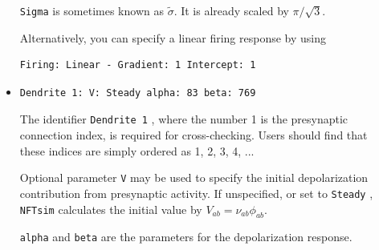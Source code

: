 \documentclass[12pt,a4paper]{article}
\newcommand{\type}[1]{{\small\small\tt #1} }
\newcommand{\NF}[0]{\type{NFTsim}}
\begin{document}
\begin{description}
\begin{itemize}
    \type{Sigma} is sometimes known as \(\tilde{\sigma}\). It is already scaled by \(\pi/\sqrt{3}\).

    Alternatively, you can specify a linear firing response by using
    \begin{lstlisting}
Firing: Linear - Gradient: 1 Intercept: 1
    \end{lstlisting}

    \item
    \begin{lstlisting}
Dendrite 1: V: Steady alpha: 83 beta: 769
    \end{lstlisting}
    The identifier \type{Dendrite 1}, where the number 1 is the presynaptic connection index, is required for cross-checking. Users should find that these indices are simply ordered as 1, 2, 3, 4, ...

    Optional parameter \type{V} may be used to specify the initial depolarization contribution from presynaptic activity. If unspecified, or set to \type{Steady}, \NF calculates the initial value by \(V_{ab}=\nu_{ab}\phi_{ab}\).

    \type{alpha} and \type{beta} are the parameters for the depolarization response.
    \end{itemize}
\end{description}
\end{document}
